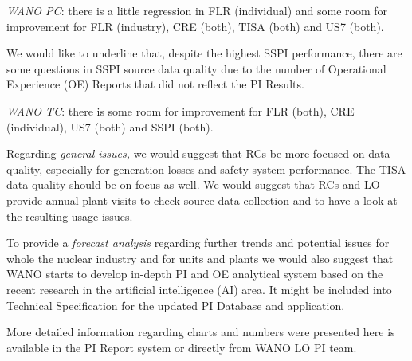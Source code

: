 \emph{WANO PC}: there is a little regression in FLR (individual)
and some room for improvement for FLR (industry), CRE (both), TISA
(both) and US7 (both).

We would like to underline that, despite the highest SSPI performance,
there are some questions in SSPI source data quality due to the number of
Operational Experience (OE) Reports that did not reflect the PI
Results.

\emph{WANO TC}: there is some room for improvement for FLR
(both), CRE (individual), US7 (both) and SSPI (both).


Regarding \emph{general issues,} we would suggest that RCs be more focused
on data quality, especially for generation losses and safety system
performance. The TISA data quality should be on focus as well. We would
suggest that RCs and LO provide annual plant visits to check source
data collection and to have a look at the resulting usage issues.

To provide a \emph{forecast analysis} regarding further trends and potential
issues for whole the nuclear industry and for units and plants we
would also suggest that WANO starts to develop in-depth PI and OE
analytical system based on the recent research in the artificial
intelligence (AI) area. It might be included into Technical
Specification for the updated PI Database and application.

More detailed information regarding charts and numbers were presented
here is available in the PI Report system or directly from WANO LO PI
team.
